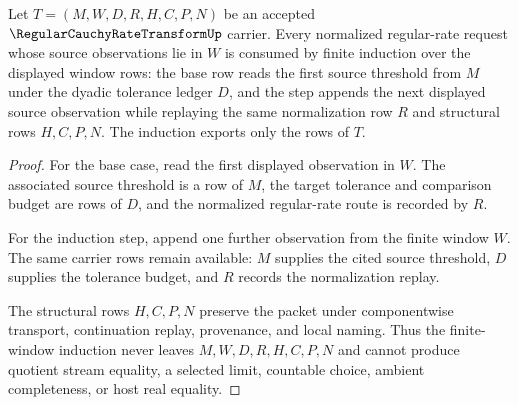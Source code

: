 \begin{theorem}
\label{thm:regular-cauchy-rate-transform-window-induction}
Let $T=(M,W,D,R,H,C,P,N)$ be an accepted $\RegularCauchyRateTransformUp$ carrier. Every normalized regular-rate request whose source observations lie in $W$ is consumed by finite induction over the displayed window rows: the base row reads the first source threshold from $M$ under the dyadic tolerance ledger $D$, and the step appends the next displayed source observation while replaying the same normalization row $R$ and structural rows $H,C,P,N$. The induction exports only the rows of $T$.
\end{theorem}
\begin{proof}
For the base case, read the first displayed observation in $W$. The associated source threshold is a row of $M$, the target tolerance and comparison budget are rows of $D$, and the normalized regular-rate route is recorded by $R$.

For the induction step, append one further observation from the finite window $W$. The same carrier rows remain available: $M$ supplies the cited source threshold, $D$ supplies the tolerance budget, and $R$ records the normalization replay.

The structural rows $H,C,P,N$ preserve the packet under componentwise transport, continuation replay, provenance, and local naming. Thus the finite-window induction never leaves $M,W,D,R,H,C,P,N$ and cannot produce quotient stream equality, a selected limit, countable choice, ambient completeness, or host real equality.
\end{proof}




